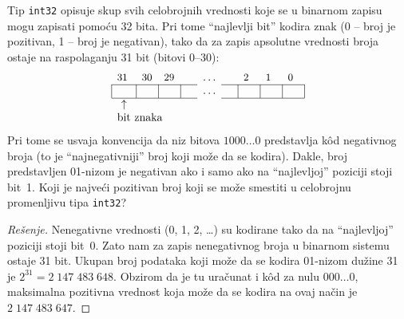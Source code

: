 \begin{EX}
  Tip \texttt{int32} opisuje skup svih celobrojnih vrednosti koje se u binarnom zapisu mogu zapisati pomo\'cu 32 bita.
  Pri tome \enquote{najlevlji bit} kodira znak (0 -- broj je pozitivan, 1 -- broj je negativan), tako da za zapis apsolutne
  vrednosti broja ostaje na raspolaganju 31 bit (bitovi 0--30):
  $$
    \begin{array}{p{1em}p{1em}p{1em}p{0.5em}p{1em}p{0.5em}p{1em}p{1em}p{1em}}
    \small 31 & \small 30 & \small 29 & & \ldots & & \small 2 & \small 1 & \small 0\\
    \cline{1-4} \cline{6-9}
    \multicolumn{1}{|c}{\ }&\multicolumn{1}{|c}{\ }&\multicolumn{1}{|c}{\ }&\multicolumn{1}{|c}{\ }&\multicolumn{1}{c}{\ldots}&\multicolumn{1}{c}{\ }&\multicolumn{1}{|c}{\ }&\multicolumn{1}{|c}{\ }&\multicolumn{1}{|c|}{\ }\\
    \cline{1-4} \cline{6-9}
    \multicolumn{1}{c}{\uparrow}\\
    \multicolumn{1}{c}{\hbox{bit}\rlap{ znaka}}
    \end{array}
  $$
  Pri tome se usvaja konvencija da niz bitova $1000\ldots0$ predstavlja k\^od negativnog broja (to je \enquote{najnegativniji} broj
  koji mo\v ze da se kodira). Dakle, broj predstavljen 01-nizom je negativan ako i samo ako na \enquote{najlevljoj} poziciji
  stoji bit~1. Koji je najve\'ci pozitivan broj koji se mo\v ze smestiti u celobrojnu promenljivu tipa \texttt{int32}?
\end{EX}
\begin{proof}[Re\v senje]
  Nenegativne vrednosti (0, 1, 2, \ldots) su kodirane tako da na \enquote{najlevljoj} poziciji
  stoji bit~0. Zato nam za zapis nenegativnog broja u binarnom sistemu ostaje 31 bit.
  Ukupan broj podataka koji mo\v ze da se kodira 01-nizom du\v zine 31 je $2^{31} = 2\;147\;483\;648$.
  Obzirom da je tu ura\v cunat i k\^od za nulu $000\ldots0$, maksimalna pozitivna vrednost koja mo\v ze
  da se kodira na ovaj na\v cin je $2\;147\;483\;647$.
\end{proof}

